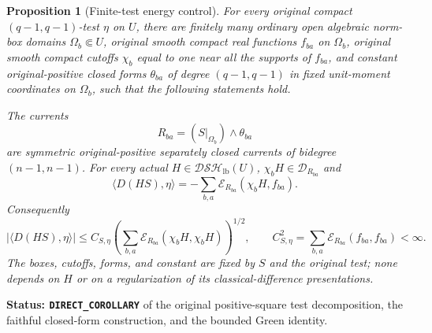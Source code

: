 \documentclass[11pt,a4paper]{article}
\numberwithin{equation}{section}
\newtheorem{proposition}[theorem]{Proposition}
\theoremstyle{definition}
\theoremstyle{remark}
\begin{document}
\begin{proposition}[Finite-test energy control]
\label{prop:r5-finite-test-relative-energy}
For every original compact $(q-1,q-1)$-test $\eta$ on $U$,
there are finitely many ordinary open algebraic norm-box domains
$\Omega_b\Subset U$, original smooth compact real functions
$f_{ba}$ on $\Omega_b$, original smooth compact cutoffs $\chi_b$
equal to one near all the supports of $f_{ba}$, and constant
original-positive closed forms $\theta_{ba}$ of degree
$(q-1,q-1)$ in fixed unit-moment coordinates on $\Omega_b$,
such that the following statements hold.

The currents
\[
             R_{ba}=(S|_{\Omega_b})\wedge\theta_{ba}
\]
are symmetric original-positive separately closed currents of
bidegree $(n-1,n-1)$. For every actual
$H\in\mathscr{DSH}_{\mathrm{lb}}(U)$,
$\chi_bH\in\mathscr D_{R_{ba}}$ and
\begin{equation}
 \langle D(HS),\eta\rangle
       =-\sum_{b,a}\mathcal E_{R_{ba}}(\chi_bH,f_{ba}).
 \label{eq:r5-finite-test-energy-identity}
\end{equation}
Consequently
\begin{equation}
 \bigl|\langle D(HS),\eta\rangle\bigr|
 \leq C_{S,\eta}
       \left(\sum_{b,a}
       \mathcal E_{R_{ba}}(\chi_bH,\chi_bH)\right)^{1/2},
 \qquad
 C_{S,\eta}^2=\sum_{b,a}
                   \mathcal E_{R_{ba}}(f_{ba},f_{ba})<\infty.
 \label{eq:r5-finite-test-energy-bound}
\end{equation}
The boxes, cutoffs, forms, and constant are fixed by $S$ and
the original test; none depends on $H$ or on a regularization
of its classical-difference presentations.
\end{proposition}

\noindent\textbf{Status: \texttt{DIRECT\_COROLLARY}} of the
original positive-square test decomposition, the faithful
closed-form construction, and the bounded Green identity.
\end{document}
